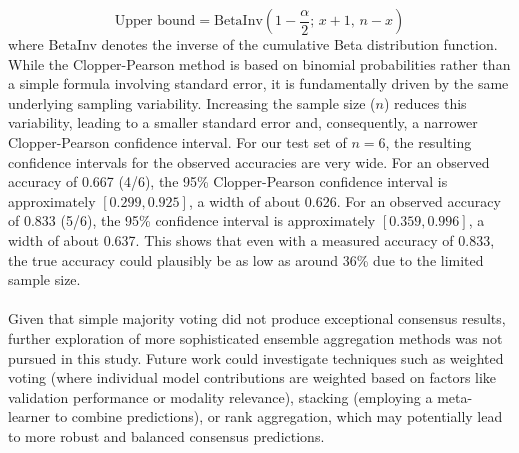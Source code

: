 \documentclass[12pt,a4paper]{report}
\begin{document}
\[
\text{Upper bound} = \text{BetaInv}\left(1 - \frac{\alpha}{2};\, x + 1,\, n - x\right)
\]
where BetaInv denotes the inverse of the cumulative Beta distribution function. While the Clopper-Pearson method is based on binomial probabilities rather than a simple formula involving standard error, it is fundamentally driven by the same underlying sampling variability. Increasing the sample size ($n$) reduces this variability, leading to a smaller standard error and, consequently, a narrower Clopper-Pearson confidence interval. For our test set of $n=6$, the resulting confidence intervals for the observed accuracies are very wide. For an observed accuracy of 0.667 (4/6), the 95\% Clopper-Pearson confidence interval is approximately $[0.299, 0.925]$, a width of about 0.626. For an observed accuracy of 0.833 (5/6), the 95\% confidence interval is approximately $[0.359, 0.996]$, a width of about 0.637. This shows that even with a measured accuracy of 0.833, the true accuracy could plausibly be as low as around 36\% due to the limited sample size.\\
\\
Given that simple majority voting did not produce exceptional consensus results, further exploration of more sophisticated ensemble aggregation methods was not pursued in this study. Future work could investigate techniques such as weighted voting (where individual model contributions are weighted based on factors like validation performance or modality relevance), stacking (employing a meta-learner to combine predictions), or rank aggregation, which may potentially lead to more robust and balanced consensus predictions.




\pagebreak
\end{document}
